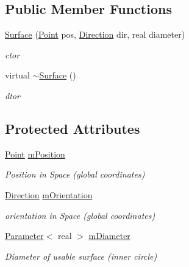 \subsection*{Public Member Functions}
\begin{DoxyCompactItemize}
\item 
\hyperlink{classSurface_ac3d233e717ad7177f340765f07b4e7cb}{Surface} (\hyperlink{classPoint}{Point} pos, \hyperlink{classDirection}{Direction} dir, real diameter)
\begin{DoxyCompactList}\small\item\em ctor \end{DoxyCompactList}\item 
virtual \hyperlink{classSurface_a89de75c95cb550d432f3ea4ed1429db0}{$\sim$\+Surface} ()\hypertarget{classSurface_a89de75c95cb550d432f3ea4ed1429db0}{}\label{classSurface_a89de75c95cb550d432f3ea4ed1429db0}

\begin{DoxyCompactList}\small\item\em dtor \end{DoxyCompactList}\end{DoxyCompactItemize}
\subsection*{Protected Attributes}
\begin{DoxyCompactItemize}
\item 
\hyperlink{classPoint}{Point} \hyperlink{classSurface_aedc39cb43d82a98b61eb45844de57658}{m\+Position}\hypertarget{classSurface_aedc39cb43d82a98b61eb45844de57658}{}\label{classSurface_aedc39cb43d82a98b61eb45844de57658}

\begin{DoxyCompactList}\small\item\em Position in Space (global coordinates) \end{DoxyCompactList}\item 
\hyperlink{classDirection}{Direction} \hyperlink{classSurface_a11e958be47f8f0aec30dac7526311507}{m\+Orientation}\hypertarget{classSurface_a11e958be47f8f0aec30dac7526311507}{}\label{classSurface_a11e958be47f8f0aec30dac7526311507}

\begin{DoxyCompactList}\small\item\em orientation in Space (global coordinates) \end{DoxyCompactList}\item 
\hyperlink{classParameter}{Parameter}$<$ real $>$ \hyperlink{classSurface_ae00d3ff70c7fd76b99c405f5c0196ebf}{m\+Diameter}\hypertarget{classSurface_ae00d3ff70c7fd76b99c405f5c0196ebf}{}\label{classSurface_ae00d3ff70c7fd76b99c405f5c0196ebf}

\begin{DoxyCompactList}\small\item\em Diameter of usable surface (inner circle) \end{DoxyCompactList}\end{DoxyCompactItemize}


